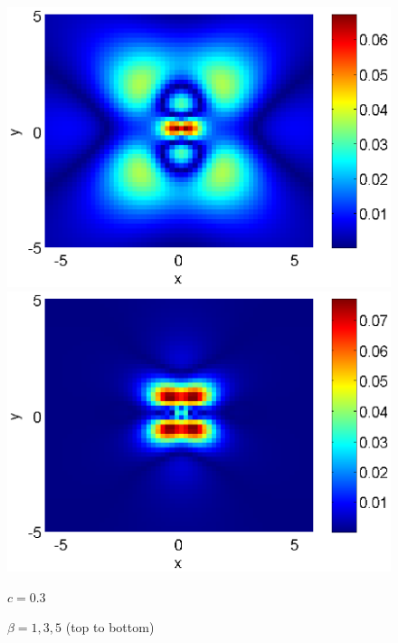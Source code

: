 \documentclass[preprint]{elsarticle}
\begin{document}
\begin{figure}[htbp]
\begin{minipage}[b]{0.5\linewidth}
	\end{minipage}
	\begin{minipage}[b]{0.5\linewidth}
		\raggedright
		 \includegraphics[width=\linewidth]{differences/difference_c=05_beta=1.eps}
	\end{minipage}
	\begin{minipage}[b]{0.5\linewidth}
		\raggedleft
		 \includegraphics[width=\linewidth]{differences/difference_c=03_beta=5.eps}
		\centerline{$c=0.3$}
		\centerline{$\beta = 1,3,5$ (top to bottom) }
	\end{minipage}
	\begin{minipage}[b]{0.5\linewidth}
		\raggedright

\end{minipage}
\end{figure}
\end{document}
